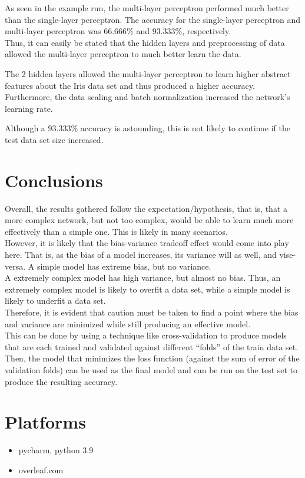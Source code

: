 \documentclass[12pt]{article}
\begin{document}
As seen in the example run, the multi-layer               
perceptron performed much better than the           
single-layer perceptron. The accuracy for the           
single-layer perceptron and multi-layer perceptron         
was 66.666\% and 93.333\%, respectively.\\

Thus, it can easily be stated that the hidden layers and               
preprocessing of data allowed the multi-layer           
perceptron to much better learn the data. 
\par
The 2 hidden layers allowed the multi-layer             
perceptron to learn higher abstract features about             
the Iris data set and thus produced a higher                 
accuracy. Furthermore, the data scaling and batch             
normalization increased the network’s learning rate.
\par
Although a 93.333\% accuracy is astounding,           
this is not likely to continue if the test data set size                       
increased.


\section{Conclusions}
Overall, the results gathered follow the           
expectation/hypothesis, that is, that a more complex             
network, but not too complex, would be able to                 
learn much more effectively than a simple one. This                 
is likely in many scenarios. \\However, it is likely                 
that the bias-variance tradeoff effect would come             
into play here. That is, as the bias of a model                     
increases, its variance will as well, and vise-versa.               
A simple model has extreme bias, but no variance.                 
\\A extremely complex model has high variance, but               
almost no bias. Thus, an extremely complex model               
is likely to overfit a data set, while a simple model                     
is likely to underfit a data set. \\Therefore, it is                   
evident that caution must be taken to find a point                   
where the bias and variance are minimized while               
still producing an effective model. \\This can be done                 
by using a technique like cross-validation to             
produce models that are each trained and validated               
against different “folds” of the train data set. Then,                 
the model that minimizes the loss function (against               
the sum of error of the validation folds) can be used                     
as the final model and can be run on the test set to                         
produce the resulting accuracy.


\section{Platforms}
\begin{itemize}
\item pycharm, python 3.9
\item overleaf.com
\end{itemize}
\end{document}
